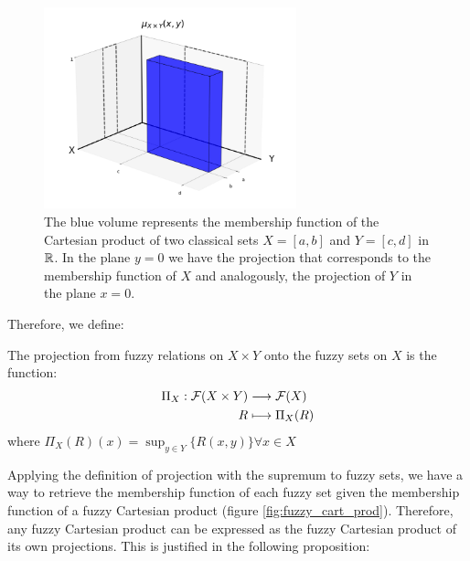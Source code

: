   \begin{figure}[ht]
    \centering
    \includegraphics[width=0.65\textwidth]{ch1/figures/class_cart_prod.png}
    \caption{The blue volume represents the membership function of the Cartesian product of two classical sets $X=[a,b]$ and $Y=[c,d]$ in $\mathbb{R}$. In the plane $y=0$ we have the projection that corresponds to the membership function of $X$ and analogously, the projection of $Y$ in the plane $x=0$.}
    \label{fig:class_cart_prod}
  \end{figure}

  Therefore, we define:

  \begin{definition}
    The projection from fuzzy relations on $X\times Y$ onto the fuzzy sets on $X$ is the function:
    \[
      \begin{aligned}
        \Pi_X: \mathcal{F}(X\times Y) &\longrightarrow \mathcal{F}(X) \\
        R &\longmapsto \Pi_X(R)
      \end{aligned}
    \]
    where $\Pi_X(R)(x) = \sup_{y\in Y}\{R(x,y)\}\forall x \in X$
  \end{definition}

  Applying the definition of projection with the supremum to fuzzy sets, we have a way to retrieve the membership function of each fuzzy set given the membership function of a fuzzy Cartesian product (figure \ref{fig:fuzzy_cart_prod}). Therefore, any fuzzy Cartesian product can be expressed as the fuzzy Cartesian product of its own projections. This is justified in the following proposition: \\







